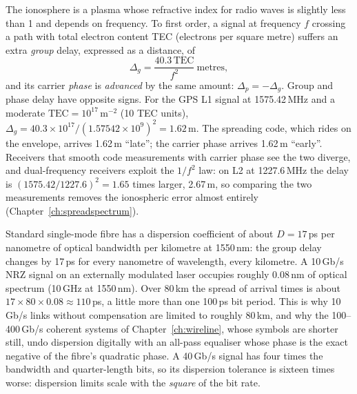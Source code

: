 \begin{worked}
The ionosphere is a plasma whose refractive index for radio waves is slightly less than 1 and
depends on frequency. To first order, a signal at frequency $f$ crossing a path with total electron
content TEC (electrons per square metre) suffers an extra \emph{group} delay, expressed as a
distance, of
\[
\Delta_g=\frac{40.3\,\mathrm{TEC}}{f^2}\ \text{metres},
\]
and its carrier \emph{phase} is \emph{advanced} by the same amount: $\Delta_p=-\Delta_g$. Group
and phase delay have opposite signs. For the GPS L1 signal at 1575.42\,MHz and a moderate
$\mathrm{TEC}=10^{17}$\,m$^{-2}$ (10 TEC units), $\Delta_g=40.3\times10^{17}/(1.57542\times10^9)^2=1.62$\,m.
The spreading code, which rides on the envelope, arrives 1.62\,m ``late''; the carrier phase arrives
1.62\,m ``early''. Receivers that smooth code measurements with carrier phase see the two diverge,
and dual-frequency receivers exploit the $1/f^2$ law: on L2 at 1227.6\,MHz the delay is
$(1575.42/1227.6)^2=1.65$ times larger, 2.67\,m, so comparing the two measurements removes the
ionospheric error almost entirely (Chapter~\ref{ch:spreadspectrum}).
\end{worked}


\begin{worked}
Standard single-mode fibre has a dispersion coefficient of about $D=17$\,ps per nanometre of
optical bandwidth per kilometre at 1550\,nm: the group delay changes by 17\,ps for every nanometre
of wavelength, every kilometre. A 10\,Gb/s NRZ signal on an externally modulated laser occupies
roughly 0.08\,nm of optical spectrum (10\,GHz at 1550\,nm). Over 80\,km the spread of arrival
times is about $17\times80\times0.08\approx110$\,ps, a little more than one 100\,ps bit period. This is
why 10\,Gb/s links without compensation are limited to roughly 80\,km, and why the 100--400\,Gb/s
coherent systems of Chapter~\ref{ch:wireline}, whose symbols are shorter still, undo dispersion
digitally with an all-pass equaliser whose phase is the exact negative of the fibre's quadratic
phase. A 40\,Gb/s signal has four times the bandwidth and quarter-length bits, so its dispersion
tolerance is sixteen times worse: dispersion limits scale with the \emph{square} of the bit rate.
\end{worked}

